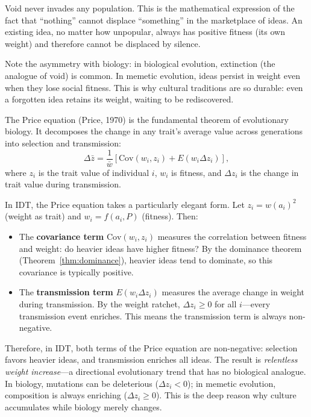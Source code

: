 \begin{interpretation}
\label{interp:silence}
Void never invades any population.  This is the mathematical expression of
the fact that ``nothing'' cannot displace ``something'' in the marketplace of
ideas.  An existing idea, no matter how unpopular, always has positive fitness
(its own weight) and therefore cannot be displaced by silence.

Note the asymmetry with biology: in biological evolution, extinction (the
analogue of void) is common.  In memetic evolution, ideas persist in weight
even when they lose social fitness.  This is why cultural traditions are so
durable: even a forgotten idea retains its weight, waiting to be rediscovered.
\end{interpretation}

\begin{remark}
\label{rem:price-equation}
The Price equation (Price, 1970) is the fundamental theorem of
evolutionary biology.  It decomposes the change in any trait's average value
across generations into selection and transmission:
\[
  \Delta \bar{z} = \frac{1}{\bar{w}} \left[
    \text{Cov}(w_i, z_i) + E(w_i \Delta z_i)
  \right],
\]
where $z_i$ is the trait value of individual $i$, $w_i$ is fitness,
and $\Delta z_i$ is the change in trait value during transmission.

In IDT, the Price equation takes a particularly elegant form.  Let
$z_i = w(a_i)^2$ (weight as trait) and $w_i = f(a_i, P)$ (fitness).
Then:
\begin{itemize}
  \item The \textbf{covariance term} $\text{Cov}(w_i, z_i)$ measures the
        correlation between fitness and weight: do heavier ideas have higher
        fitness?  By the dominance theorem
        (Theorem~\ref{thm:dominance}), heavier ideas tend to dominate,
        so this covariance is typically positive.
  \item The \textbf{transmission term} $E(w_i \Delta z_i)$ measures the
        average change in weight during transmission.  By the weight ratchet,
        $\Delta z_i \geq 0$ for all $i$---every transmission event enriches.
        This means the transmission term is always non-negative.
\end{itemize}

Therefore, in IDT, both terms of the Price equation are non-negative:
selection favors heavier ideas, and transmission enriches all ideas.  The
result is \emph{relentless weight increase}---a directional evolutionary
trend that has no biological analogue.  In biology, mutations can be
deleterious ($\Delta z_i < 0$); in memetic evolution, composition is
always enriching ($\Delta z_i \geq 0$).  This is the deep reason why
culture accumulates while biology merely changes.
\end{remark}

